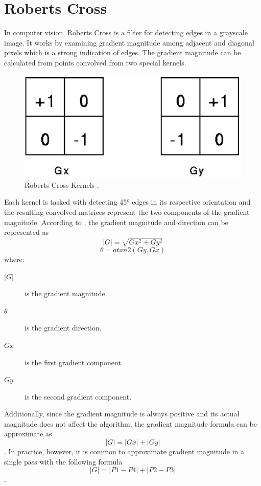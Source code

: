 \documentclass[conference]{IEEEtran}
\begin{document}
\section{Roberts Cross}
In computer vision, Roberts Cross is a filter for detecting edges in a grayscale image. It works by examining gradient magnitude among adjacent and diagonal pixels which is a strong indication of edges. The gradient magnitude can be calculated from points convolved from two special kernels.
\begin{figure}[!htb]
    \centering
    \includegraphics[scale = 0.3]{RC_K.png}
    \caption{Roberts Cross Kernels \cite{fisher-perkins-walker-wolfart:2003}.}
\end{figure}
Each kernel is tasked with detecting 45° edges in its respective orientation and the resulting convolved matrices represent the two components of the gradient magnitude. According to \cite{fisher-perkins-walker-wolfart:2003}, the gradient magnitude and direction can be represented as \[|G| = \sqrt{Gx^2+Gy^2}\] \[\theta = atan2(Gy,Gx)\] where:
\begin{description}
    \item[$|G|$] is the gradient magnitude.
    \item[$\theta$] is the gradient direction.
    \item[$Gx$] is the first gradient component.
    \item[$Gy$] is the second gradient component.
\end{description}
Additionally, since the gradient magnitude is always positive and its actual magnitude does not affect the algorithm, the gradient magnitude formula can be approximate as \cite{fisher-perkins-walker-wolfart:2003} \[|G| = |Gx| + |Gy|\]. In practice, however, it is common to approximate gradient magnitude in a single pass with the following formula \cite{fisher-perkins-walker-wolfart:2003} \[|G| = |P1-P4| + |P2-P3|\].
\end{document}
